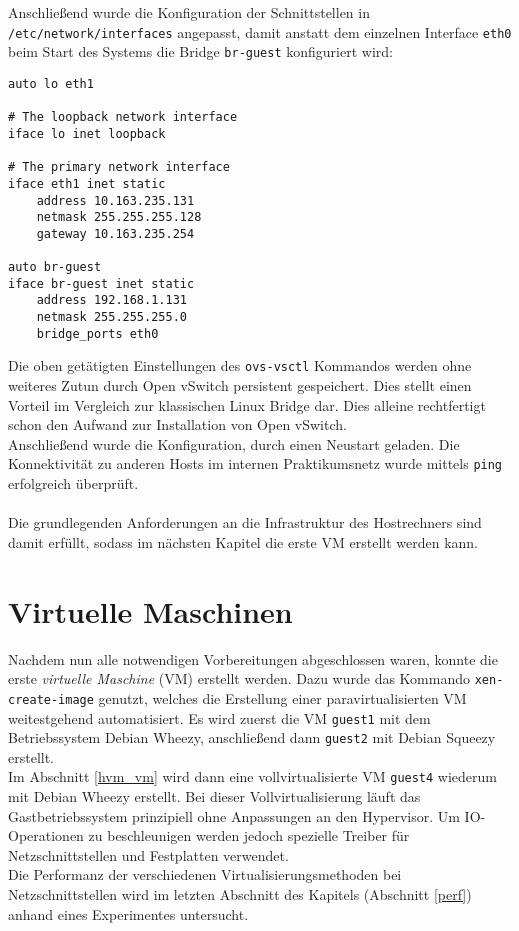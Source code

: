 Anschließend wurde die Konfiguration der Schnittstellen in \verb#/etc/network/interfaces# angepasst, damit anstatt dem einzelnen Interface \verb#eth0# beim Start des Systems die Bridge \verb#br-guest# konfiguriert wird:
\setupVerbatimOut
\begin{verbatim}
auto lo eth1

# The loopback network interface
iface lo inet loopback

# The primary network interface
iface eth1 inet static
    address 10.163.235.131
    netmask 255.255.255.128
    gateway 10.163.235.254

auto br-guest
iface br-guest inet static
    address 192.168.1.131
    netmask 255.255.255.0
    bridge_ports eth0
\end{verbatim}

Die oben getätigten Einstellungen des \verb#ovs-vsctl# Kommandos werden ohne weiteres Zutun durch Open vSwitch persistent gespeichert. Dies stellt einen Vorteil im Vergleich zur klassischen Linux Bridge dar. Dies alleine rechtfertigt schon den Aufwand zur Installation von Open vSwitch. 
\\
Anschließend wurde die Konfiguration, durch einen Neustart geladen. Die Konnektivität zu anderen Hosts im internen Praktikumsnetz wurde mittels \verb#ping# erfolgreich überprüft.
\\
\\
Die grundlegenden Anforderungen an die Infrastruktur des Hostrechners sind damit erfüllt, sodass im nächsten Kapitel die erste VM erstellt werden kann.

\chapter{Virtuelle Maschinen}\label{vms}
Nachdem nun alle notwendigen Vorbereitungen abgeschlossen waren, konnte die erste \emph{virtuelle Maschine} (VM) erstellt werden. Dazu wurde das Kommando \verb#xen-create-image# genutzt, welches die Erstellung einer paravirtualisierten VM weitestgehend automatisiert. Es wird zuerst die VM \verb#guest1# mit dem Betriebssystem Debian Wheezy, anschließend dann \verb#guest2# mit Debian Squeezy erstellt.
\\
Im Abschnitt \ref{hvm_vm} wird dann eine vollvirtualisierte VM \verb#guest4# wiederum mit Debian Wheezy erstellt. Bei dieser Vollvirtualisierung läuft das Gastbetriebssystem prinzipiell ohne Anpassungen an den Hypervisor. Um IO-Operationen zu beschleunigen werden jedoch spezielle Treiber für Netzschnittstellen und Festplatten verwendet. 
\\
Die Performanz der verschiedenen Virtualisierungsmethoden bei Netzschnittstellen wird im letzten Abschnitt des Kapitels (Abschnitt \ref{perf}) anhand eines Experimentes untersucht.

